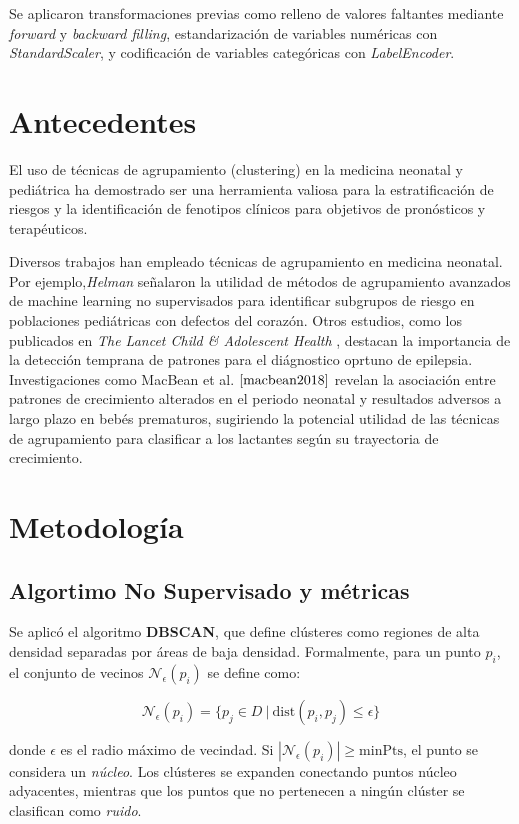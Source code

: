 \documentclass[12pt]{article}
\begin{document}
Se aplicaron transformaciones previas como relleno de valores faltantes mediante \emph{forward} y \emph{backward filling}, estandarización de variables numéricas con \emph{StandardScaler}, y codificación de variables categóricas con \emph{LabelEncoder}.

\section{Antecedentes}
El uso de técnicas de agrupamiento (clustering) en la medicina neonatal y pediátrica ha demostrado ser una herramienta valiosa para la estratificación de riesgos y la identificación de fenotipos clínicos para objetivos de pronósticos y terapéuticos.

Diversos trabajos han empleado técnicas de agrupamiento en medicina neonatal. Por ejemplo,\emph{Helman}\cite{helman2025} señalaron la utilidad de métodos de agrupamiento avanzados de machine learning no supervisados para identificar subgrupos de riesgo en poblaciones pediátricas con defectos del corazón. Otros estudios, como los publicados en \emph{The Lancet Child \& Adolescent Health} \cite{thelancet2020}, destacan la importancia de la detección temprana de patrones para el diágnostico oprtuno de epilepsia. Investigaciones como MacBean et al. $\cite{macbean2018}$ revelan la asociación entre patrones de crecimiento alterados en el periodo neonatal y resultados adversos a largo plazo en bebés prematuros, sugiriendo la potencial utilidad de las técnicas de agrupamiento para clasificar a los lactantes según su trayectoria de crecimiento.

\section{Metodología}
\subsection{Algortimo No Supervisado y métricas}
Se aplicó el algoritmo \textbf{DBSCAN}, que define clústeres como regiones de alta densidad separadas por áreas de baja densidad. Formalmente, para un punto $p_i$, el conjunto de vecinos $\mathcal{N}_\epsilon(p_i)$ se define como:

\[
\mathcal{N}_\epsilon(p_i) = \{ p_j \in D \ | \ \text{dist}(p_i, p_j) \leq \epsilon \}
\]

donde $\epsilon$ es el radio máximo de vecindad. Si $|\mathcal{N}_\epsilon(p_i)| \geq \text{minPts}$, el punto se considera un \emph{núcleo}. Los clústeres se expanden conectando puntos núcleo adyacentes, mientras que los puntos que no pertenecen a ningún clúster se clasifican como \emph{ruido}.
\end{document}
